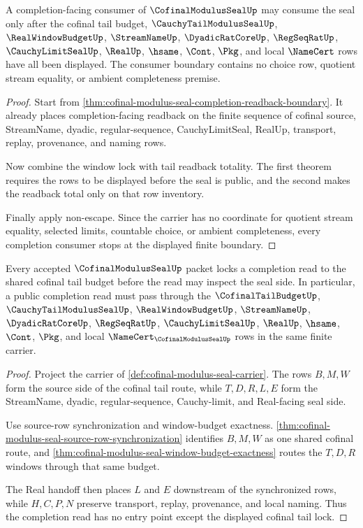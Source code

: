 \begin{theorem}
\label{thm:cofinal-modulus-seal-completion-consumer-boundary}
A completion-facing consumer of $\CofinalModulusSealUp$ may consume the seal only after the cofinal tail budget, $\CauchyTailModulusSealUp$, $\RealWindowBudgetUp$, $\StreamNameUp$, $\DyadicRatCoreUp$, $\RegSeqRatUp$, $\CauchyLimitSealUp$, $\RealUp$, $\hsame$, $\Cont$, $\Pkg$, and local $\NameCert$ rows have all been displayed. The consumer boundary contains no choice row, quotient stream equality, or ambient completeness premise.
\end{theorem}
\begin{proof}
Start from \autoref{thm:cofinal-modulus-seal-completion-readback-boundary}. It already places completion-facing readback on the finite sequence of cofinal source, StreamName, dyadic, regular-sequence, CauchyLimitSeal, RealUp, transport, replay, provenance, and naming rows.

Now combine the window lock with tail readback totality. The first theorem requires the rows to be displayed before the seal is public, and the second makes the readback total only on that row inventory.

Finally apply non-escape. Since the carrier has no coordinate for quotient stream equality, selected limits, countable choice, or ambient completeness, every completion consumer stops at the displayed finite boundary.
\end{proof}

\begin{theorem}
\label{thm:cofinal-modulus-seal-tail-cofinality-lock}
Every accepted $\CofinalModulusSealUp$ packet locks a completion read to the shared cofinal tail budget before the read may inspect the seal side. In particular, a public completion read must pass through the $\CofinalTailBudgetUp$, $\CauchyTailModulusSealUp$, $\RealWindowBudgetUp$, $\StreamNameUp$, $\DyadicRatCoreUp$, $\RegSeqRatUp$, $\CauchyLimitSealUp$, $\RealUp$, $\hsame$, $\Cont$, $\Pkg$, and local $\NameCert_{\CofinalModulusSealUp}$ rows in the same finite carrier.
\end{theorem}
\begin{proof}
Project the carrier of \autoref{def:cofinal-modulus-seal-carrier}. The rows $B,M,W$ form the source side of the cofinal tail route, while $T,D,R,L,E$ form the StreamName, dyadic, regular-sequence, Cauchy-limit, and Real-facing seal side.

Use source-row synchronization and window-budget exactness. \autoref{thm:cofinal-modulus-seal-source-row-synchronization} identifies $B,M,W$ as one shared cofinal route, and \autoref{thm:cofinal-modulus-seal-window-budget-exactness} routes the $T,D,R$ windows through that same budget.

The Real handoff then places $L$ and $E$ downstream of the synchronized rows, while $H,C,P,N$ preserve transport, replay, provenance, and local naming. Thus the completion read has no entry point except the displayed cofinal tail lock.
\end{proof}

